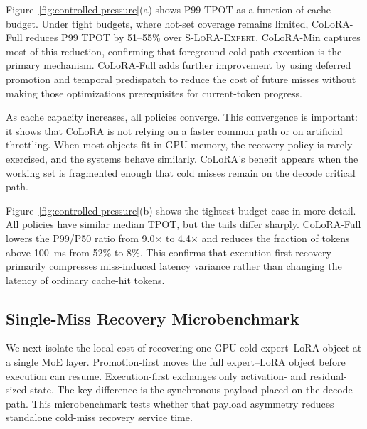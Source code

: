 \documentclass[sigplan,anonymous,review,10pt]{acmart}
\begin{document}
Figure~\ref{fig:controlled-pressure}(a) shows P99 TPOT as a function of cache budget. Under tight budgets, where hot-set coverage remains limited, CoLoRA-Full reduces P99 TPOT by 51--55\% over \textsc{S-LoRA-Expert}. CoLoRA-Min captures most of this reduction, confirming that foreground cold-path execution is the primary mechanism. CoLoRA-Full adds further improvement by using deferred promotion and temporal predispatch to reduce the cost of future misses without making those optimizations prerequisites for current-token progress.

As cache capacity increases, all policies converge. This convergence is important: it shows that CoLoRA is not relying on a faster common path or on artificial throttling. When most objects fit in GPU memory, the recovery policy is rarely exercised, and the systems behave similarly. CoLoRA's benefit appears when the working set is fragmented enough that cold misses remain on the decode critical path.

Figure~\ref{fig:controlled-pressure}(b) shows the tightest-budget case in more detail. All policies have similar median TPOT, but the tails differ sharply. CoLoRA-Full lowers the P99/P50 ratio from 9.0$\times$ to 4.4$\times$ and reduces the fraction of tokens above 100~ms from 52\% to 8\%. This confirms that execution-first recovery primarily compresses miss-induced latency variance rather than changing the latency of ordinary cache-hit tokens.

\subsection{Single-Miss Recovery Microbenchmark}
\label{subsec:microbenchmark}

We next isolate the local cost of recovering one GPU-cold expert--LoRA object at a single MoE layer. Promotion-first moves the full expert--LoRA object before execution can resume. Execution-first exchanges only activation- and residual-sized state. The key difference is the synchronous payload placed on the decode path. This microbenchmark tests whether that payload asymmetry reduces standalone cold-miss recovery service time.

\end{document}
